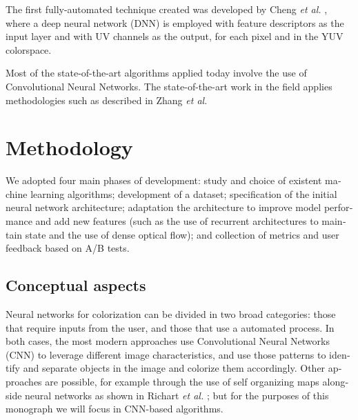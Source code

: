 \documentclass[12pt,openright,twoside,a4paper,english]{abntex2}
\begin{document}
\begin{otherlanguage}{english}
The first fully-automated technique created was developed by Cheng \textit{et al.} \cite{Cheng2015},
where a deep neural network (DNN) is employed with feature descriptors as the input layer and with UV channels as the output, for each pixel and in the YUV colorspace.


Most of the state-of-the-art algorithms applied today involve the use of Convolutional Neural Networks.
The state-of-the-art work in the field applies methodologies such as described in Zhang \textit{et al.} \cite{colorful}








\chapter{Methodology}

We adopted four main phases of development: study and choice of existent machine learning algorithms; development of a dataset; specification of the initial neural network architecture; adaptation the architecture to improve model performance and add new features (such as the use of recurrent architectures to maintain state and the use of dense optical flow); and collection of metrics and user feedback based on A/B tests.

\section{Conceptual aspects} \label{sec:Concept}
Neural networks for colorization can be divided in two broad categories: those that require inputs from the user, and those that use a automated process. In both cases, the most modern approaches use Convolutional Neural Networks (CNN) to leverage different image characteristics, and use those patterns to identify and separate objects in the image and colorize them accordingly. Other approaches are possible, for example through the use of self organizing maps alongside neural networks as shown in Richart \textit{et al.} \cite{Richart_som_nn}; but for the purposes of this monograph we will focus in CNN-based algorithms.


\end{otherlanguage}
\end{document}
